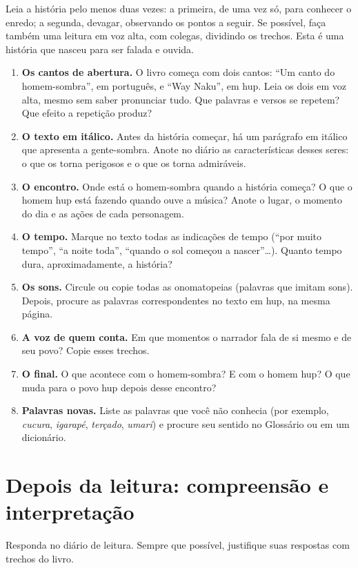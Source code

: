 Leia a história pelo menos duas vezes: a primeira, de uma vez só, para
conhecer o enredo; a segunda, devagar, observando os pontos a seguir.
Se possível, faça também uma leitura em voz alta, com colegas, dividindo
os trechos. Esta é uma história que nasceu para ser falada e ouvida.

\begin{enumerate}[label=\arabic*.]
\item \textbf{Os cantos de abertura.} O livro começa com dois
cantos: ``Um canto do homem-sombra'', em português, e ``Way Naku'', em
hup. Leia os dois em voz alta, mesmo sem saber pronunciar tudo. Que
palavras e versos se repetem? Que efeito a repetição produz?
\item \textbf{O texto em itálico.} Antes da história começar,
há um parágrafo em itálico que apresenta a gente-sombra. Anote no diário
as características desses seres: o que os torna perigosos e o que os
torna admiráveis.
\item \textbf{O encontro.} Onde está o homem-sombra quando a
história começa? O que o homem hup está fazendo quando ouve a música?
Anote o lugar, o momento do dia e as ações de cada personagem.
\item \textbf{O tempo.} Marque no texto todas as indicações
de tempo (``por muito tempo'', ``a noite toda'', ``quando o sol começou
a nascer''\ldots). Quanto tempo dura, aproximadamente, a história?
\item \textbf{Os sons.} Circule ou copie todas as
onomatopeias (palavras que imitam sons). Depois, procure as palavras
correspondentes no texto em hup, na mesma página.
\item \textbf{A voz de quem conta.} Em que momentos o
narrador fala de si mesmo e de seu povo? Copie esses trechos.
\item \textbf{O final.} O que acontece com o homem-sombra? E
com o homem hup? O que muda para o povo hup depois desse encontro?
\item \textbf{Palavras novas.} Liste as palavras que você não
conhecia (por exemplo, \textit{cucura}, \textit{igarapé},
\textit{terçado}, \textit{umari}) e procure seu sentido no Glossário ou
em um dicionário.
\end{enumerate}

\chapter{Depois da leitura: compreensão e interpretação}

Responda no diário de leitura. Sempre que possível, justifique suas
respostas com trechos do livro.

